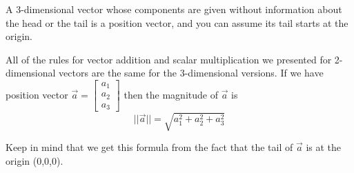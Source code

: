 A 3-dimensional vector whose components are given without information about the head or the tail is a position vector, and you can assume its tail starts at the origin.

\newpage

All of the rules for vector addition and scalar multiplication we presented for 2-dimensional vectors are the same for the 3-dimensional versions. If we have position vector $\overrightarrow{a} = \begin{bmatrix}
a_1\\a_2\\a_3
\end{bmatrix}$ then the magnitude of $\overrightarrow{a}$ is
$$||\overrightarrow{a}|| = \sqrt{a_1^2 + a_2^2 + a_3^2}$$

Keep in mind that we get this formula from the fact that the tail of $\overrightarrow{a}$ is at the origin (0,0,0).

\newpage




